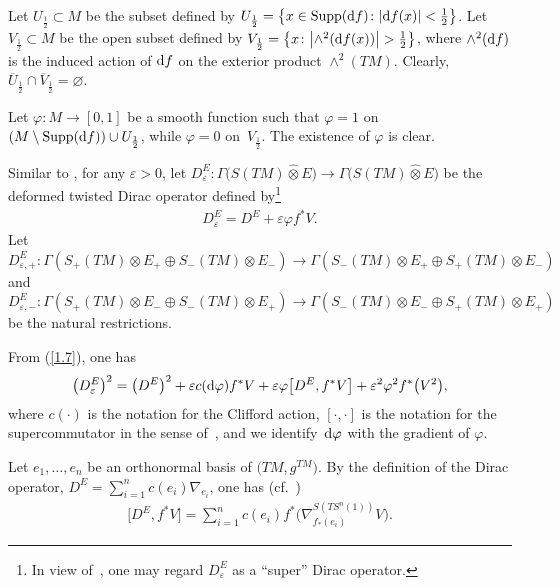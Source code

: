 Let $U_{\frac{1}{2}}\subset M$ be the subset defined by
$U_{\frac{1}{2}}=\big\{ x\in \operatorname{Supp}({\rm d}f)\colon |{\rm d}f(x)|<\frac{1}{2}\big\}$. Let $V_{\frac{1}{2}}\subset M$ be the open subset defined by $V_{\frac{1}{2}}=\big\{ x \colon \big|{\wedge}^2({\rm d}f(x))\big|>\frac{1}{2}\big\}$, where $\wedge^2({\rm d}f)$ is the induced action of ${\rm d}f$ on the exterior product $\wedge^2(TM)$. Clearly, $\overline{U}_{\frac{1}{2}}\cap \overline{V}_{\frac{1}{2}}=\varnothing$.

Let $\varphi\colon M\rightarrow [0,1]$ be a smooth function such that $\varphi=1$ on $(M\setminus \operatorname{Supp}({\rm d}f) )\cup U_{\frac{1}{2}}$, while $\varphi=0$ on~$V_{\frac{1}{2}}$. The existence of $\varphi$ is clear.

Similar to \cite[equation~(1.11)]{Z19}, for any $\varepsilon>0$, let $D^E_\varepsilon\colon \Gamma\big(S(TM)\widehat\otimes E\big)\rightarrow
\Gamma\big(S(TM)\widehat\otimes E\big)$ be the deformed twisted Dirac operator defined by\footnote{In view of~\cite{Q85}, one may regard $D^E_\varepsilon$ as a ``super'' Dirac operator.}
\begin{gather}\label{1.7}
D^E_\varepsilon =D^E+\varepsilon \varphi f^*V.
\end{gather}
Let $D^E_{\varepsilon,+}\colon \Gamma(S_+(TM) \otimes E_+\oplus S_-(TM)\otimes E_-) \rightarrow \Gamma(S_-(TM) \otimes E_+\oplus S_+(TM)\otimes E_-) $ and $D^E_{\varepsilon,-}\colon \Gamma(S_+(TM) \otimes E_-\oplus S_-(TM)\otimes E_+) \rightarrow \Gamma(S_-(TM) \otimes E_-\oplus S_+(TM)\otimes E_+) $ be the natural restrictions.

From (\ref{1.7}), one has
\begin{gather}\label{1.8}
\big(D^E_\varepsilon\big)^2 =\big(D^E\big)^2+\varepsilon c({\rm d}\varphi) f^*V
+\varepsilon \varphi\big[D^E,f^*V\big]+\varepsilon^2\varphi^2f^*\big(V^2\big),
\end{gather}
where $c(\cdot)$ is the notation for the Clifford action, $[\cdot,\cdot]$ is the notation for the supercommutator in the sense of~\cite{Q85}, and we identify~${\rm d}\varphi$ with the gradient of $\varphi$.

Let $e_1, \dots, e_n$ be an orthonormal basis of $\big(TM,g^{TM}\big)$. By the definition of the Dirac operator, $D^E=\sum\limits_{i=1}^n c(e_i)\nabla_{e_i}$, one has (cf.~\cite{Z19})
\begin{gather}\label{1.13}
\big[D^E,f^*V\big] =\sum_{i=1}^nc (e_i ) f^* \big(\nabla^{S(TS^n(1))}_{f_*(e_i)}V\big).
\end{gather}

